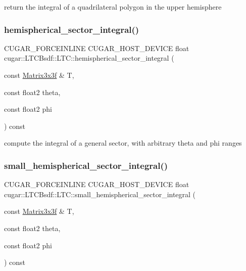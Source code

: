 return the integral of a quadrilateral polygon in the upper hemisphere \mbox{\label{structcugar_1_1_l_t_c_bsdf_1_1_l_t_c_a3df8a52a50e9305544b9fc304dfb0221}} 
\subsubsection{\texorpdfstring{hemispherical\+\_\+sector\+\_\+integral()}{hemispherical\_sector\_integral()}}
{\footnotesize\ttfamily C\+U\+G\+A\+R\+\_\+\+F\+O\+R\+C\+E\+I\+N\+L\+I\+NE C\+U\+G\+A\+R\+\_\+\+H\+O\+S\+T\+\_\+\+D\+E\+V\+I\+CE float cugar\+::\+L\+T\+C\+Bsdf\+::\+L\+T\+C\+::hemispherical\+\_\+sector\+\_\+integral (\begin{DoxyParamCaption}\item[{const \hyperlink{structcugar_1_1_matrix}{Matrix3x3f} \&}]{T,  }\item[{const float2}]{theta,  }\item[{const float2}]{phi }\end{DoxyParamCaption}) const\hspace{0.3cm}{\ttfamily [inline]}}

compute the integral of a general sector, with arbitrary theta and phi ranges \mbox{\label{structcugar_1_1_l_t_c_bsdf_1_1_l_t_c_a7d4903a9fdc6a04cc1f54796b9cfaa65}} 
\subsubsection{\texorpdfstring{small\+\_\+hemispherical\+\_\+sector\+\_\+integral()}{small\_hemispherical\_sector\_integral()}}
{\footnotesize\ttfamily C\+U\+G\+A\+R\+\_\+\+F\+O\+R\+C\+E\+I\+N\+L\+I\+NE C\+U\+G\+A\+R\+\_\+\+H\+O\+S\+T\+\_\+\+D\+E\+V\+I\+CE float cugar\+::\+L\+T\+C\+Bsdf\+::\+L\+T\+C\+::small\+\_\+hemispherical\+\_\+sector\+\_\+integral (\begin{DoxyParamCaption}\item[{const \hyperlink{structcugar_1_1_matrix}{Matrix3x3f} \&}]{T,  }\item[{const float2}]{theta,  }\item[{const float2}]{phi }\end{DoxyParamCaption}) const\hspace{0.3cm}{\ttfamily [inline]}}

